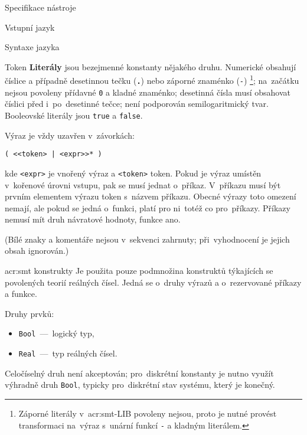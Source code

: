 \documentclass[thesis=M,czech]{FITthesis}[2012/06/26]
\newcommand{\acrlabel}[1]{acr:#1}
\newcommand{\acr}[1]{\acrshort{\acrlabel{#1}}}
\newcommand{\id}[1]{\texttt{#1}}
\newcommand{\hll}[1]{\textbf{#1}}
\begin{document}
\begin{section}{Specifikace nástroje}
\begin{subsection}{Vstupní jazyk}
\begin{subsubsection}{Syntaxe jazyka}
\begin{paragraph}{Token}
\hll{Literály} jsou bezejmenné konstanty
nějakého druhu.
Numerické obsahují číslice a případně desetinnou tečku (\id{\hll{.}})
nebo záporné znaménko (\id{-})%
\footnote{Záporné literály v~\acr{smt}-LIB povoleny nejsou,
proto je nutné provést transformaci na~výraz
s~unární funkcí \id{-} a kladným literálem.};
na~začátku nejsou povoleny přídavné \id{0} a kladné znaménko;
desetinná čísla musí obsahovat číslici před i~po~desetinné tečce;
není podporován semilogaritmický tvar.
Booleovské literály jsou \id{true} a \id{false}.
\end{paragraph} %


\begin{paragraph}{Výraz}\label{p:design:spec:ilang:struct:expr}
je vždy uzavřen v~závorkách:
\begin{center}
\id{( <{}<token> | <expr>{}>* )}
\end{center}
kde \id{<expr>} je vnořený výraz
a \id{<token>} token.
Pokud je výraz umístěn v~kořenové úrovni vstupu,
pak se musí jednat o~příkaz.
V~příkazu musí být prvním elementem výrazu
token s~názvem příkazu.
Obecné výrazy toto omezení nemají,
ale pokud se jedná o~funkci,
platí pro ni~totéž co pro~příkazy.
Příkazy nemusí mít druh návratové hodnoty,
funkce ano.

(Bílé znaky a komentáře nejsou v~sekvenci zahrnuty;
při~vyhodnocení je jejich obsah ignorován.)
\end{paragraph} %


\end{subsubsection} %


\begin{subsubsection}{\acr{smt} konstrukty}\label{sss:design:spec:ilang:smt}
Je použita pouze podmnožina konstruktů
týkajících se povolených teorií reálných čísel.
Jedná se o~druhy výrazů
a o~rezervované příkazy a funkce.


\begin{paragraph}{Druhy prvků:}\label{p:design:spec:ilang:smt:sorts}
\begin{itemize}
\item \id{Bool}~---~logický typ,
\item \id{Real}~---~typ reálných čísel.
\end{itemize}
Celočíselný druh není akceptován;
pro~diskrétní konstanty je nutno využít výhradně druh \id{Bool},
typicky pro~diskrétní stav systému, který je konečný.
\end{paragraph} %


\end{subsubsection}
\end{subsection}
\end{section}
\end{document}
